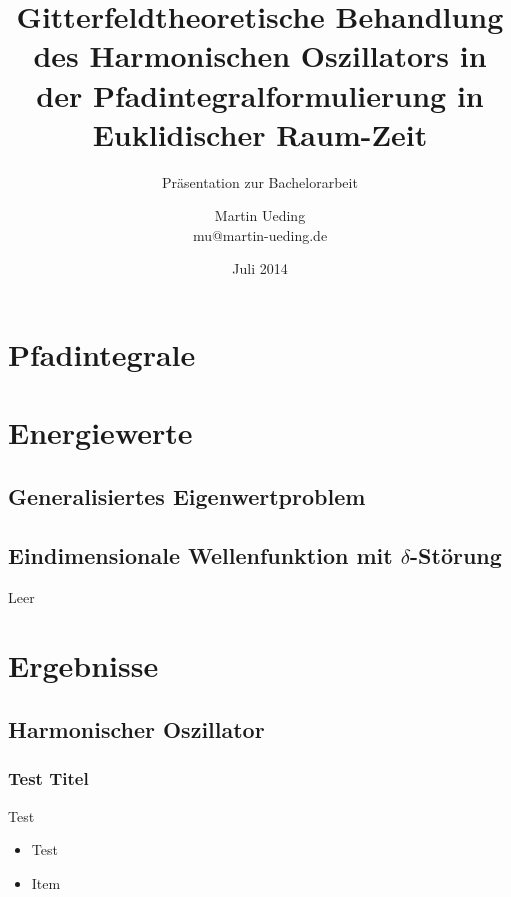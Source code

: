 \documentclass[ngerman, fleqn]{beamer}
\title{Gitterfeldtheoretische Behandlung des Harmonischen Oszillators in der Pfadintegralformulierung in Euklidischer Raum-Zeit}
\subtitle{Präsentation zur Bachelorarbeit}
\author{Martin Ueding \\ mu@martin-ueding.de}
\date{Juli 2014}
\begin{document}
\begin{frame}
    \titlepage
\end{frame}

\begin{frame}
    \tableofcontents
\end{frame}

\section{Pfadintegrale}

\section{Energiewerte}

\subsection{Generalisiertes Eigenwertproblem}

\subsection{Eindimensionale Wellenfunktion mit $\delta$-Störung}

\begin{frame}
    Leer
\end{frame}


\section{Ergebnisse}

\subsection{Harmonischer Oszillator}

\begin{frame}
    \frametitle{Test Titel}
    Test 

    \begin{itemize}
        \item Test
        \item Item
    \end{itemize}

    \parencite{penrose-road_to_reality}
\end{frame}
\end{document}
